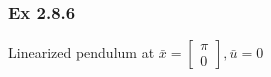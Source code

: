 \documentclass[letterpaper]{article}
\begin{document}
\subsubsection*{Ex 2.8.6} Linearized pendulum at $\bar x=\begin{bmatrix}\pi\\0\end{bmatrix},\bar u=0$
\begin{align*}

\end{align*}
		    
		    
		    
		    
		    
		    
		    
		    
		    
		    
		    
		    
		    
		    
		    
		    
		    
		    
		    
		    
		    
		    
		    
		    
		    
		    
		    
		    
		    
		    
		    
		    
		    
		    
		    
\end{document}
